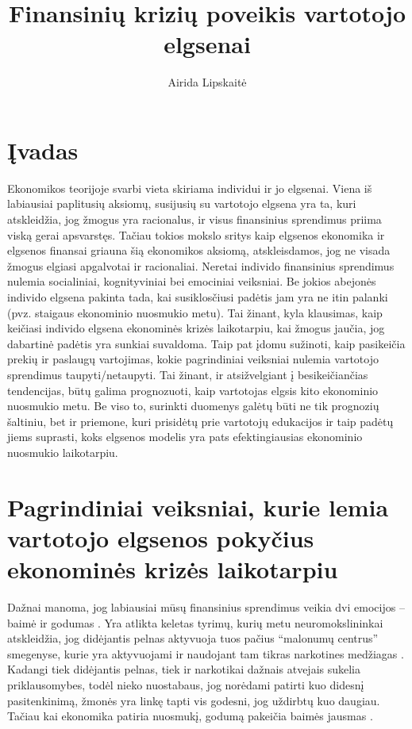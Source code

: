 \documentclass[l1pt, titlepage]{article}
\title{\textbf{Finansinių krizių poveikis vartotojo elgsenai}}
\author{Airida Lipskaitė}
\begin{document}
\maketitle
\tableofcontents
\newpage

\section{Įvadas}
Ekonomikos teorijoje svarbi vieta skiriama individui ir jo elgsenai. Viena iš labiausiai paplitusių aksiomų, susijusių su vartotojo elgsena yra ta, kuri atskleidžia, jog žmogus yra racionalus, ir visus finansinius sprendimus priima viską gerai apsvarstęs. Tačiau tokios mokslo sritys kaip elgsenos ekonomika ir elgsenos finansai griauna šią ekonomikos aksiomą, atskleisdamos, jog ne visada žmogus elgiasi apgalvotai ir racionaliai. Neretai individo finansinius sprendimus nulemia socialiniai, kognityviniai bei emociniai veiksniai. Be jokios abejonės individo elgsena pakinta tada, kai susiklosčiusi padėtis jam yra ne itin palanki (pvz. staigaus ekonominio nuosmukio metu). Tai žinant, kyla klausimas, kaip keičiasi individo elgsena ekonominės krizės laikotarpiu, kai žmogus jaučia, jog dabartinė padėtis yra sunkiai suvaldoma. Taip pat įdomu sužinoti, kaip pasikeičia prekių ir paslaugų vartojimas, kokie pagrindiniai veiksniai nulemia vartotojo sprendimus taupyti/netaupyti. Tai žinant, ir atsižvelgiant į besikeičiančias tendencijas, būtų galima prognozuoti, kaip vartotojas elgsis kito ekonominio nuosmukio metu. Be viso to, surinkti duomenys galėtų būti ne tik prognozių šaltiniu, bet ir priemone, kuri prisidėtų prie vartotojų edukacijos ir taip padėtų jiems suprasti, koks elgsenos modelis yra pats efektingiausias ekonominio nuosmukio laikotarpiu.

\section{Pagrindiniai veiksniai, kurie lemia vartotojo elgsenos pokyčius ekonominės krizės laikotarpiu}
Dažnai manoma, jog labiausiai mūsų finansinius sprendimus veikia dvi emocijos – baimė ir godumas \cite{lo2005fear}. Yra atlikta keletas tyrimų, kurių metu neuromokslininkai atskleidžia, jog didėjantis pelnas aktyvuoja tuos pačius “malonumų centrus”  smegenyse, kurie yra aktyvuojami ir naudojant  tam tikras narkotines medžiagas \cite{reavis2009global}. Kadangi tiek didėjantis pelnas, tiek ir narkotikai dažnais atvejais sukelia priklausomybes, todėl nieko nuostabaus, jog norėdami patirti kuo didesnį pasitenkinimą, žmonės yra linkę tapti vis godesni, jog uždirbtų kuo daugiau. Tačiau kai ekonomika patiria nuosmukį, godumą pakeičia baimės jausmas \cite{reavis2009global}. 
\end{document}
